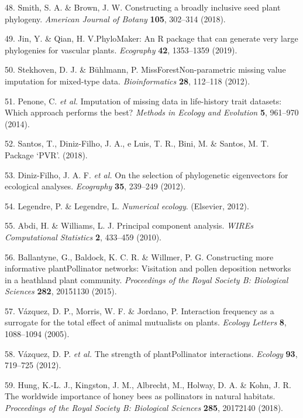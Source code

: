 \documentclass[12pt,a4paper,]{article}
\begin{document}
\hypertarget{ref-smith2018}{}
48. Smith, S. A. \& Brown, J. W. Constructing a broadly inclusive seed
plant phylogeny. \emph{American Journal of Botany} \textbf{105},
302--314 (2018).

\hypertarget{ref-jin2019}{}
49. Jin, Y. \& Qian, H. V.PhyloMaker: An R package that can generate
very large phylogenies for vascular plants. \emph{Ecography}
\textbf{42}, 1353--1359 (2019).

\hypertarget{ref-stekhoven2012}{}
50. Stekhoven, D. J. \& Bühlmann, P. MissForestNon-parametric missing
value imputation for mixed-type data. \emph{Bioinformatics} \textbf{28},
112--118 (2012).

\hypertarget{ref-penone2014}{}
51. Penone, C. \emph{et al.} Imputation of missing data in life-history
trait datasets: Which approach performs the best? \emph{Methods in
Ecology and Evolution} \textbf{5}, 961--970 (2014).

\hypertarget{ref-santos2018}{}
52. Santos, T., Diniz-Filho, J. A., e Luis, T. R., Bini, M. \& Santos,
M. T. Package `PVR'. (2018).

\hypertarget{ref-diniz-filho2012}{}
53. Diniz-Filho, J. A. F. \emph{et al.} On the selection of phylogenetic
eigenvectors for ecological analyses. \emph{Ecography} \textbf{35},
239--249 (2012).

\hypertarget{ref-legendre2012}{}
54. Legendre, P. \& Legendre, L. \emph{Numerical ecology}. (Elsevier,
2012).

\hypertarget{ref-abdi2010}{}
55. Abdi, H. \& Williams, L. J. Principal component analysis.
\emph{WIREs Computational Statistics} \textbf{2}, 433--459 (2010).

\hypertarget{ref-ballantyne2015}{}
56. Ballantyne, G., Baldock, K. C. R. \& Willmer, P. G. Constructing
more informative plantPollinator networks: Visitation and pollen
deposition networks in a heathland plant community. \emph{Proceedings of
the Royal Society B: Biological Sciences} \textbf{282}, 20151130 (2015).

\hypertarget{ref-vazquez2005}{}
57. Vázquez, D. P., Morris, W. F. \& Jordano, P. Interaction frequency
as a surrogate for the total effect of animal mutualists on plants.
\emph{Ecology Letters} \textbf{8}, 1088--1094 (2005).

\hypertarget{ref-vazquez2012}{}
58. Vázquez, D. P. \emph{et al.} The strength of plantPollinator
interactions. \emph{Ecology} \textbf{93}, 719--725 (2012).

\hypertarget{ref-hung2018}{}
59. Hung, K.-L. J., Kingston, J. M., Albrecht, M., Holway, D. A. \&
Kohn, J. R. The worldwide importance of honey bees as pollinators in
natural habitats. \emph{Proceedings of the Royal Society B: Biological
Sciences} \textbf{285}, 20172140 (2018).
\end{document}
